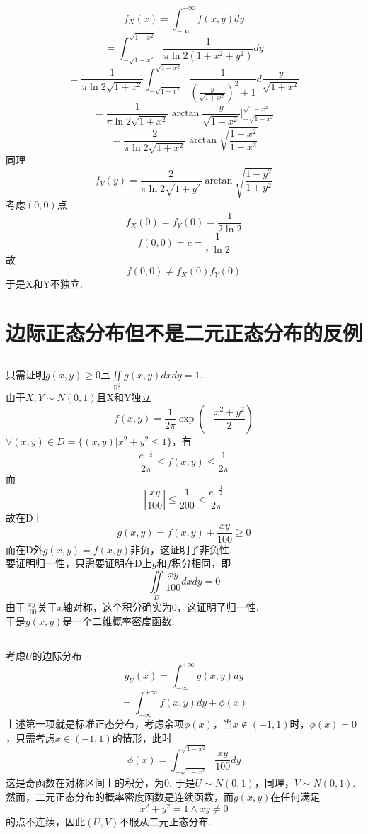 \documentclass{article}
\begin{document}
\begin{CJK}{UTF8}{gbsn}
\subsection{}
$$ f_{X}(x)=\int_{-\infty}^{+\infty}f(x,y)dy $$
$$ =\int_{-\sqrt{1-x^{2}}}^{\sqrt{1-x^{2}}}\frac{1}{\pi\ln2(1+x^{2}+y^{2})}dy$$
$$ =\frac{1}{\pi\ln2\sqrt{1+x^{2}}}\int_{-\sqrt{1-x^{2}}}^{\sqrt{1-x^{2}}}\frac{1}{(\frac{y}{\sqrt{1+x^{2}}})^{2}+1}d\frac{y}{\sqrt{1+x^{2}}}$$
$$ =\frac{1}{\pi\ln2\sqrt{1+x^{2}}}\arctan\frac{y}{\sqrt{1+x^{2}}}|_{-\sqrt{1-x^{2}}}^{\sqrt{1-x^{2}}}$$
$$ =\frac{2}{\pi\ln2\sqrt{1+x^{2}}}\arctan{\sqrt{\frac{1-x^{2}}{1+x^{2}}}}$$
同理
$$ f_{Y}(y)=\frac{2}{\pi\ln2\sqrt{1+y^{2}}}\arctan{\sqrt{\frac{1-y^{2}}{1+y^{2}}}}$$
考虑$(0,0)$点
$$ f_{X}(0)=f_{Y}(0)=\frac{1}{2\ln2}$$
$$ f(0,0)=c=\frac{1}{\pi\ln2}$$
故
$$ f(0,0)\neq f_{X}(0)f_{Y}(0) $$
于是X和Y不独立.
\section{边际正态分布但不是二元正态分布的反例}
\subsection{}
只需证明$g(x,y)\geq 0$且$\iint\limits_{\mathbb{R}^{2}}g(x,y)dxdy=1$.
\\由于$X,Y\sim N(0,1)$且X和Y独立
$$ f(x,y)=\frac{1}{2\pi}\exp{(-\frac{x^{2}+y^{2}}{2})}$$
$\forall (x,y)\in D=\{(x,y)|x^{2}+y^{2}\leq 1\}$，有
$$ \frac{e^{-\frac{1}{2}}}{2\pi}\leq f(x,y)\leq \frac{1}{2\pi}$$
而
$$ |\frac{xy}{100}|\leq \frac{1}{200}<\frac{e^{-\frac{1}{2}}}{2\pi}$$
故在D上
$$ g(x,y)=f(x,y)+\frac{xy}{100}\geq 0$$
而在D外$g(x,y)=f(x,y)$非负，这证明了非负性.
\\要证明归一性，只需要证明在D上$g$和$f$积分相同，即
$$ \iint\limits_{D}\frac{xy}{100}dxdy=0$$
由于$\frac{xy}{100}$关于$x$轴对称，这个积分确实为0，这证明了归一性.
\\于是$g(x,y)$是一个二维概率密度函数.
\subsection{}
考虑$U$的边际分布
$$ g_{U}(x)=\int_{-\infty}^{+\infty}g(x,y)dy$$
$$ =\int_{-\infty}^{+\infty}f(x,y)dy+\phi(x)$$
上述第一项就是标准正态分布，考虑余项$\phi(x)$，当$x\notin (-1,1)$时，$\phi(x)=0$，只需考虑$x\in(-1,1)$的情形，此时
$$ \phi(x)=\int_{-\sqrt{1-x^{2}}}^{\sqrt{1-x^{2}}}\frac{xy}{100}dy$$
这是奇函数在对称区间上的积分，为0. 于是$U\sim N(0,1)$，同理，$V\sim N(0,1)$.
\\然而，二元正态分布的概率密度函数是连续函数，而$g(x,y)$在任何满足
$$ x^{2}+y^{2}=1\land xy\neq 0$$
的点不连续，因此$(U,V)$不服从二元正态分布.

\end{CJK}
\end{document}
